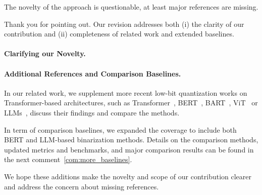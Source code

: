 \begin{revcommentToAssociateEditor}
The novelty of the approach is questionable, at least major references are missing. 
\end{revcommentToAssociateEditor}
\begin{revmeta}[]
Thank you for pointing out. Our revision addresses both (i) the clarity of our contribution and (ii) completeness of related work and extended baselines. 

\paragraph{Clarifying our Novelty. }
\paragraph{Additional References and Comparison Baselines. }
In our related work, we supplement more recent low-bit quantization works on Transformer-based architectures, such as Transformer~\cite{chung-etal-2020-extremely}, BERT~\cite{xing2024bipft,mlbert,bebert}, BART~\cite{liu-2023-binary-and-ternary-nlg}, ViT~\cite{binaryvit} or LLMs~\cite{llm-qat,xiao2023smoothquant,gptq,lin2024awq,shao2023omniquant,chen2024dbllm,huang2024billm}, discuss their findings and compare the methods. 

In term of comparison baselines, we expanded the coverage to include both BERT and LLM-based binarization methods. Details on the comparison methods, updated metrics and benchmarks, and major comparison results can be found in the next comment~\ref{com:more_baselines}. 

We hope these additions make the novelty and scope of our contribution clearer and address the concern about missing references.
\end{revmeta}


